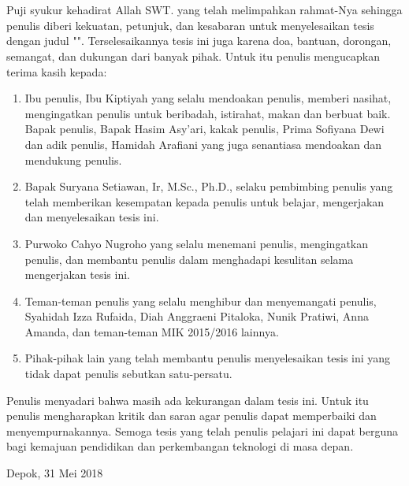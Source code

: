 \chapter*{\kataPengantar}

Puji syukur kehadirat Allah SWT. yang telah melimpahkan rahmat-Nya sehingga penulis diberi kekuatan, petunjuk, dan kesabaran untuk menyelesaikan tesis dengan judul "\judul". Terselesaikannya tesis ini juga karena doa, bantuan, dorongan, semangat, dan dukungan dari banyak pihak. Untuk itu penulis mengucapkan terima kasih kepada:

\begin{enumerate}
\item Ibu penulis, Ibu Kiptiyah yang selalu mendoakan penulis, memberi nasihat, mengingatkan penulis untuk beribadah, istirahat, makan dan berbuat baik. Bapak penulis, Bapak Hasim Asy'ari, kakak penulis, Prima Sofiyana Dewi dan adik penulis, Hamidah Arafiani yang juga senantiasa mendoakan dan mendukung penulis.

\item Bapak Suryana Setiawan, Ir, M.Sc., Ph.D., selaku pembimbing penulis yang telah memberikan kesempatan kepada penulis untuk belajar, mengerjakan dan menyelesaikan tesis ini.

\item Purwoko Cahyo Nugroho yang selalu menemani penulis, mengingatkan penulis, dan membantu penulis dalam menghadapi kesulitan selama mengerjakan tesis ini.

\item Teman-teman penulis yang selalu menghibur dan menyemangati penulis, Syahidah Izza Rufaida, Diah Anggraeni Pitaloka, Nunik Pratiwi, Anna Amanda, dan teman-teman MIK 2015/2016 lainnya.

\item Pihak-pihak lain yang telah membantu penulis menyelesaikan tesis ini yang tidak dapat penulis sebutkan satu-persatu.

\end{enumerate}

Penulis menyadari bahwa masih ada kekurangan dalam tesis ini. Untuk itu penulis mengharapkan kritik dan saran agar penulis dapat memperbaiki dan menyempurnakannya. Semoga tesis yang telah penulis pelajari ini dapat berguna bagi kemajuan pendidikan dan perkembangan teknologi di masa depan.

\vspace*{0.1cm}
\begin{flushright}
Depok, 31 Mei 2018\\[0.1cm]
\vspace*{1cm}
\penulis

\end{flushright}